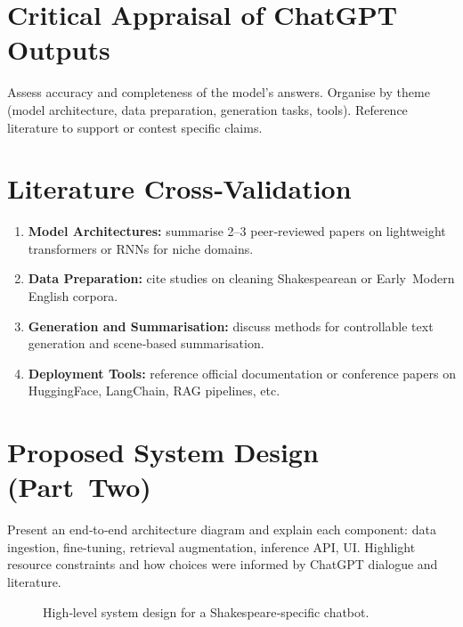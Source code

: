 \documentclass[11pt,a4paper]{article}
\begin{document}
	\section{Critical Appraisal of ChatGPT Outputs}
	Assess accuracy and completeness of the model’s answers. Organise by
	theme (model architecture, data preparation, generation tasks, tools).
	Reference literature to support or contest specific claims.
	
	\section{Literature Cross‑Validation}
	\begin{enumerate}[label=\arabic*.]
		\item \textbf{Model Architectures:} summarise 2–3 peer‑reviewed
		papers on lightweight transformers or RNNs for niche domains.
		\item \textbf{Data Preparation:} cite studies on cleaning Shakespearean
		or Early Modern English corpora.
		\item \textbf{Generation and Summarisation:} discuss methods for
		controllable text generation and scene‑based summarisation.
		\item \textbf{Deployment Tools:} reference official documentation or
		conference papers on HuggingFace, LangChain, RAG pipelines, etc.
	\end{enumerate}
	
	\section{Proposed System Design (Part Two)}
	Present an end‑to‑end architecture diagram 
	and explain each component: data ingestion, fine‑tuning, retrieval
	augmentation, inference API, UI. Highlight resource constraints and how
	choices were informed by ChatGPT dialogue and literature.
	
	\begin{figure}[h]
		\centering
		\caption{High‑level system design for a Shakespeare‑specific chatbot.}
		\label{fig:architecture}
	\end{figure}
	
\end{document}

